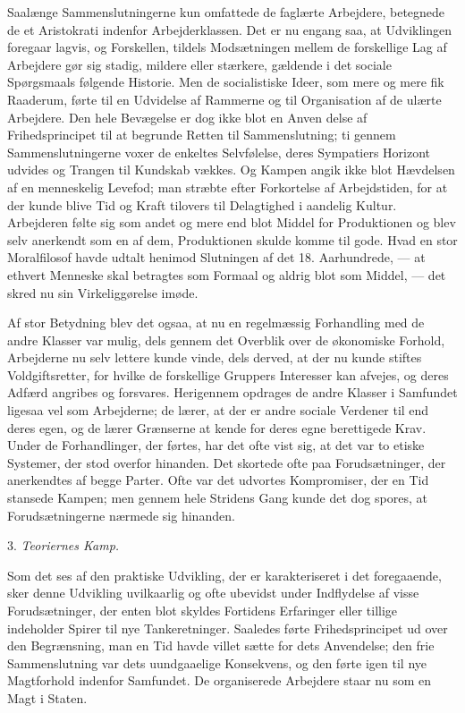 \documentclass[12pt,a4paper,openany]{book}
\newcommand{\opage}[1]{\marginnote{\footnotesize\textit{[#1]}}}
\newcommand{\sectionhead}[2]{\par\bigskip\phantomsection\begin{center}#1 \textit{#2}\end{center}\addcontentsline{toc}{section}{#1 #2}\medskip\ignorespaces}
\begin{document}
Saalænge Sammenslutningerne kun omfattede de faglærte Arbejdere,
betegnede de et Aristokrati indenfor Arbejderklassen. Det er
nu engang saa, at Udviklingen foregaar lagvis, og Forskellen, tildels
Modsætningen mellem de forskellige Lag af Arbejdere gør sig stadig,
mildere eller stærkere, gældende i det sociale Spørgsmaals følgende
Historie. Men de socialistiske Ideer, som mere og mere fik Raaderum,
førte til en Udvidelse af Rammerne og til Organisation af de
ulærte Arbejdere. Den hele Bevægelse er dog ikke blot en Anven%
\opage{92}delse af Frihedsprincipet til at begrunde Retten til Sammenslutning;
ti gennem Sammenslutningerne voxer de enkeltes Selvfølelse, deres
Sympatiers Horizont udvides og Trangen til Kundskab vækkes. Og
Kampen angik ikke blot Hævdelsen af en menneskelig Levefod;
man stræbte efter Forkortelse af Arbejdstiden, for at der kunde blive
Tid og Kraft tilovers til Delagtighed i aandelig Kultur. Arbejderen
følte sig som andet og mere end blot Middel for Produktionen og
blev selv anerkendt som en af dem, Produktionen skulde komme til
gode. Hvad en stor Moralfilosof havde udtalt henimod Slutningen
af det 18. Aarhundrede, --- at ethvert Menneske skal betragtes som
Formaal og aldrig blot som Middel, --- det skred nu sin Virkeliggørelse
imøde.

Af stor Betydning blev det ogsaa, at nu en regelmæssig Forhandling
med de andre Klasser var mulig, dels gennem det Overblik over
de økonomiske Forhold, Arbejderne nu selv lettere kunde vinde,
dels derved, at der nu kunde stiftes Voldgiftsretter, for hvilke de
forskellige Gruppers Interesser kan afvejes, og deres Adfærd angribes
og forsvares. Herigennem opdrages de andre Klasser i Samfundet
ligesaa vel som Arbejderne; de lærer, at der er andre sociale Verdener
til end deres egen, og de lærer Grænserne at kende for deres
egne berettigede Krav. Under de Forhandlinger, der førtes, har det
ofte vist sig, at det var to etiske Systemer, der stod overfor hinanden.
Det skortede ofte paa Forudsætninger, der anerkendtes af begge Parter.
Ofte var det udvortes Kompromiser, der en Tid stansede Kampen;
men gennem hele Stridens Gang kunde det dog spores, at Forudsætningerne
nærmede sig hinanden.

\sectionhead{3.}{Teoriernes Kamp.}

Som det ses af den praktiske Udvikling, der er karakteriseret i
det foregaaende, sker denne Udvikling uvilkaarlig og ofte ubevidst
under Indflydelse af visse Forudsætninger, der enten blot skyldes
Fortidens Erfaringer eller tillige indeholder Spirer til nye Tankeretninger.
Saaledes førte Frihedsprincipet ud over den Begrænsning,
man en Tid havde villet sætte for dets Anvendelse; den frie Sammenslutning
var dets uundgaaelige Konsekvens, og den førte igen til nye
Magtforhold indenfor Samfundet. De organiserede Arbejdere staar
nu som en Magt i Staten.
\end{document}
